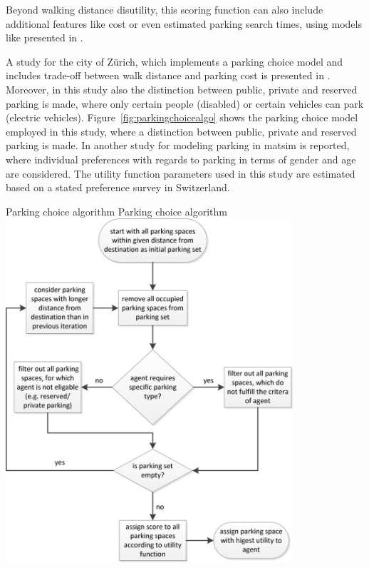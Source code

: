 Beyond walking distance disutility, this scoring function can also include additional features like cost or even estimated parking search times, \eg using models like presented in \citet[][]{HorniEtAl_IATBRspec_2013}.

A study for the city of Zürich, which implements a parking choice model and includes trade-off between walk distance and parking cost is presented in \citet[][]{WaraichAxhausen_TRR_2012}. Moreover, in this study also the distinction between public, private and reserved parking is made, where only certain people (\eg disabled) or certain vehicles can park (\eg electric vehicles). Figure~\ref{fig:parkingchoicealgo} shows the parking choice model employed in this study, where a distinction between public, private and reserved parking is made. In \citet[][]{WaraichEtAl_unpub_TRB_2013} another study for modeling parking in \gls{matsim} is reported, where individual preferences with regards to parking in terms of gender and age are considered. The utility function parameters used in this study are estimated based on a stated preference survey in Switzerland.

\createfigure%
{Parking choice algorithm}%
{Parking choice algorithm}%
{\label{fig:parkingchoicealgo}}%
{\includegraphics[width=0.8\textwidth, angle=0]{extending/figures/Parking/parking_algo.png}}%
{\citet[][]{WaraichAxhausen_TRR_2012}}

